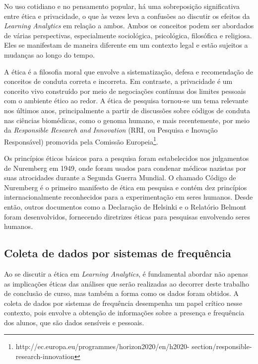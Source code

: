 No uso cotidiano e no pensamento popular, há uma sobreposição significativa entre ética e privacidade, o que às vezes leva a confusões ao discutir os efeitos da \textit{Learning Analytics} em relação a ambos. Ambos os conceitos podem ser abordados de várias perspectivas, especialmente sociológica, psicológica, filosófica e religiosa. Eles se manifestam de maneira diferente em um contexto legal e estão sujeitos a mudanças ao longo do tempo.

A ética é a filosofia moral que envolve a sistematização, defesa e recomendação de conceitos de conduta correta e incorreta. Em contraste, a privacidade é um conceito vivo construído por meio de negociações contínuas dos limites pessoais com o ambiente ético ao redor. A ética de pesquisa tornou-se um tema relevante nos últimos anos, principalmente a partir de discussões sobre códigos de conduta nas ciências biomédicas, como o genoma humano, e mais recentemente, por meio da \textit{Responsible Research and Innovation} (RRI, ou Pesquisa e Inovação Responsável) promovida pela Comissão Europeia\footnote{http://ec.europa.eu/programmes/horizon2020/en/h2020-
section/responsible-research-innovation}.

Os princípios éticos básicos para a pesquisa foram estabelecidos nos julgamentos de Nuremberg em 1949, onde foram usados para condenar médicos nazistas por suas atrocidades durante a Segunda Guerra Mundial. O chamado Código de Nuremberg é o primeiro manifesto de ética em pesquisa e contém dez princípios internacionalmente reconhecidos para a experimentação em seres humanos. Desde então, outros documentos como a Declaração de Helsinki \cite{Helsinki} e o Relatório Belmont \cite{belmont} foram desenvolvidos, fornecendo diretrizes éticas para pesquisas envolvendo seres humanos.


\subsection{Coleta de dados por sistemas de frequência}

Ao se discutir a ética em \textit{Learning Analytics}, é fundamental abordar não apenas as implicações éticas das análises que serão realizadas ao decorrer deste trabalho de conclusão de curso, mas também a forma como os dados foram obtidos. A coleta de dados por sistemas de frequência desempenha um papel crítico nesse contexto, pois envolve a obtenção de informações sobre a presença e frequência dos alunos, que são dados sensíveis e pessoais.

